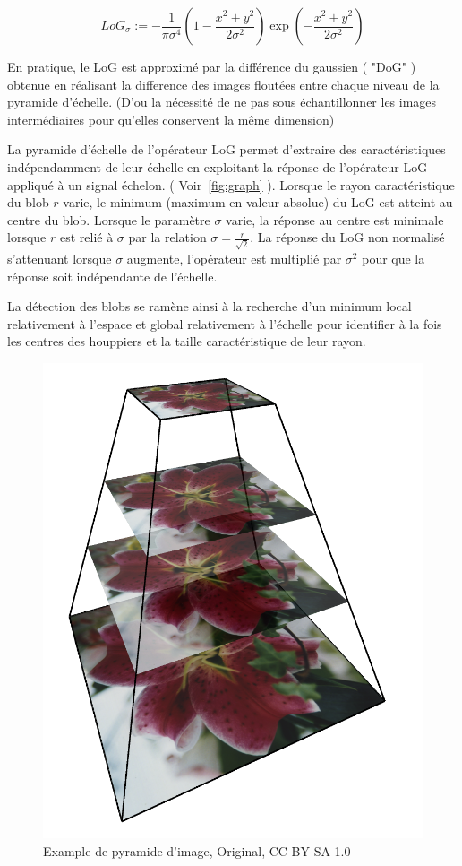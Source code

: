\documentclass{article}
\begin{document}
	\[{LoG}_{\sigma}:=-\frac{1}{\pi\sigma^{4}}(1-\frac{x^{2}+y^{2}}{2\sigma^{2}})\exp(-\frac{x^{2}+y^{2}}{2\sigma^{2}})\] 

	En pratique, le LoG est approximé par la différence du gaussien ( "DoG" ) obtenue en réalisant la difference des images floutées entre chaque niveau de la pyramide d'échelle. (D'ou la nécessité de ne pas sous échantillonner les images intermédiaires pour qu'elles conservent la même dimension)

	La pyramide d'échelle de l'opérateur LoG permet d'extraire des caractéristiques indépendamment de leur échelle en exploitant la réponse de l'opérateur LoG appliqué à un signal échelon. ( Voir~\ref{fig:graph} ). Lorsque le rayon caractéristique du blob $r$ varie, le minimum (maximum en valeur absolue) du LoG est atteint au centre du blob. Lorsque le paramètre $\sigma$ varie, la réponse au centre est minimale lorsque $r$ est relié à $\sigma$ par la relation $\sigma=\frac{r}{\sqrt{2}}$. La réponse du LoG non normalisé s'attenuant lorsque $\sigma$ augmente, l'opérateur est multiplié par $\sigma^{2}$ pour que la réponse soit indépendante de l'échelle.

	La détection des blobs se ramène ainsi à la recherche d'un minimum local relativement à l'espace et global relativement à l'échelle pour identifier à la fois les centres des houppiers et la taille caractéristique de leur rayon. 

\begin{figure}
	\centering
	\includegraphics[scale=0.15]{img.png}
	\caption{Example de pyramide d'image, Original, CC BY-SA 1.0}
	\label{fig:ex}
\end{figure}
\end{document}

